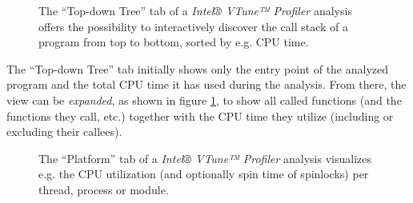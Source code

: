 \begin{@empty}
    \setlength{\fboxsep}{0pt}%
    \setlength{\fboxrule}{1pt}%
    
    \begin{figure}[h!]
        \centering
        \vspace{.75em}
        \caption[Top-down view of an analysis done by the VTune™ Profiler]{The ``Top-down Tree'' tab of a \textit{Intel® VTune™ Profiler} analysis offers the possibility to interactively discover the call stack of a program from top to bottom, sorted by e.g. CPU time.}
        \label{fig:vtunetopdowntree}
    \end{figure}
\end{@empty}

    The ``Top-down Tree'' tab initially shows only the entry point of the analyzed program and the total CPU time it has used during the analysis. From there, the view can be \emph{expanded}, as shown in figure \ref{fig:vtunetopdowntree}, to show all called functions (and the functions they call, etc.) together with the CPU time they utilize (including or excluding their callees).

\begin{@empty}
    \setlength{\fboxsep}{0pt}%
    \setlength{\fboxrule}{1pt}%
    
    \begin{figure}[h!]
        \centering
        \vspace{.75em}
        \caption[Platform view of an analysis done by the VTune™ Profiler]{The ``Platform'' tab of a \textit{Intel® VTune™ Profiler} analysis visualizes e.g. the CPU utilization (and optionally spin time of spinlocks) per thread, process or module.}
        \label{fig:vtuneplatform}
    \end{figure}
\end{@empty}

